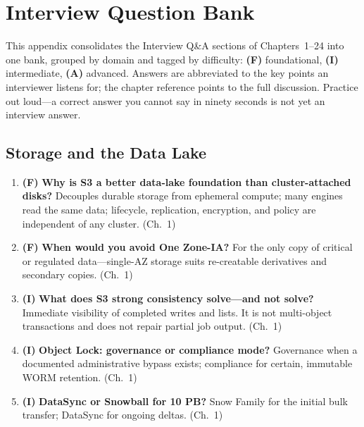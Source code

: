 \chapter{Interview Question Bank}
%
This appendix consolidates the Interview Q\&A sections of Chapters~1--24 into one bank, grouped
by domain and tagged by difficulty: \textbf{(F)} foundational, \textbf{(I)} intermediate,
\textbf{(A)} advanced. Answers are abbreviated to the key points an interviewer listens for; the
chapter reference points to the full discussion. Practice out loud---a correct answer you cannot
say in ninety seconds is not yet an interview answer.

\section{Storage and the Data Lake}
\begin{enumerate}
    \item \textbf{(F)} \textbf{Why is S3 a better data-lake foundation than cluster-attached disks?}
    Decouples durable storage from ephemeral compute; many engines read the same data; lifecycle,
    replication, encryption, and policy are independent of any cluster. (Ch.~1)
    \item \textbf{(F)} \textbf{When would you avoid One Zone-IA?}
    For the only copy of critical or regulated data---single-AZ storage suits re-creatable
    derivatives and secondary copies. (Ch.~1)
    \item \textbf{(I)} \textbf{What does S3 strong consistency solve---and not solve?}
    Immediate visibility of completed writes and lists. It is not multi-object transactions and
    does not repair partial job output. (Ch.~1)
    \item \textbf{(I)} \textbf{Object Lock: governance or compliance mode?}
    Governance when a documented administrative bypass exists; compliance for certain, immutable
    WORM retention. (Ch.~1)
    \item \textbf{(I)} \textbf{DataSync or Snowball for 10 PB?}
    Snow Family for the initial bulk transfer; DataSync for ongoing deltas. (Ch.~1)
\end{enumerate}

